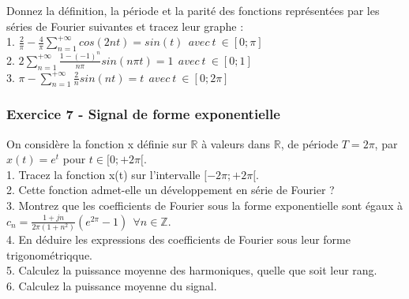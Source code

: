 	Donnez la définition, la période et la parité des fonctions représentées par les séries de Fourier suivantes et tracez leur graphe :\\
	
	1. $	\frac{2}{\pi}-\frac{4}{\pi}\sum_{n=1}^{+\infty}cos(2nt)=sin(t)~~avec~t~\in[0;\pi]$\\
	
	2. $	2\sum_{n=1}^{+\infty}\frac{1-(-1)^{n}}{n \pi}sin(n \pi t)=1~~avec~t~\in[0;1]$ \\
	
	3. $	\pi-\sum_{n=1}^{+\infty}\frac{2}{n}sin(nt)=t~~avec~t~\in[0;2\pi]$ \\
	
	
	\subsubsection{Exercice 7 - Signal de forme exponentielle}
	On considère la fonction x définie sur $\mathbb{R}$ à valeurs dans $\mathbb{R}$, de période $T=2\pi$, par $x(t)=e^{t}$ pour $t\in [0;+2\pi[$.\\
	
	1. Tracez la fonction x(t) sur l'intervalle $[-2\pi;+2\pi[$.\\
	
	2. Cette fonction admet-elle un développement en série de Fourier ?\\
	
	3. Montrez que les coefficients de Fourier sous la forme exponentielle sont égaux à $c_{n}=\frac{1+jn}{2\pi(1+n^{2})}(e^{2\pi}-1)~~\forall n \in \mathbb{Z}$.\\
	
	4. En déduire les expressions des coefficients de Fourier sous leur forme trigonométriqque.\\
	
	5. Calculez la puissance moyenne des harmoniques, quelle que soit leur rang.\\
	
	6. Calculez la puissance moyenne du signal.\\
	

	
	

